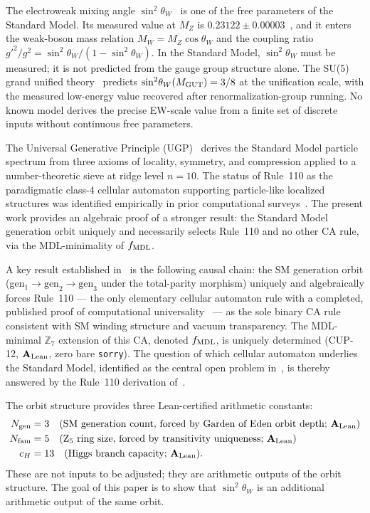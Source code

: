 \documentclass[11pt]{article}
\theoremstyle{remark}
\newcommand{\Ngen}{N_{\rm gen}}
\newcommand{\Nfam}{N_{\rm fam}}
\newcommand{\cH}{c_H}
\newcommand{\sinwsq}{\sin^2\!\theta_W}
\newcommand{\CatAL}{\ensuremath{\textbf{A}_{\rm Lean}}}
\begin{document}
The electroweak mixing angle $\sinwsq$~\cite{Weinberg1967,Glashow1961,Salam1968} is one of the free parameters of the Standard Model.
Its measured value at $M_Z$ is $0.23122 \pm 0.00003$~\cite{ParticleDataGroup2022}, and it
enters the weak-boson mass relation $M_W = M_Z \cos\theta_W$ and the coupling ratio
$g'^2/g^2 = \sinwsq/(1 - \sinwsq)$.
In the Standard Model, $\sinwsq$ must be measured; it is not predicted from the gauge
group structure alone.
The SU(5) grand unified theory~\cite{GeorgiGlashow1974} predicts
$\sinwsq(M_{\rm GUT}) = 3/8$ at the unification scale, with the measured low-energy
value recovered after renormalization-group running.
No known model derives the precise EW-scale value from a finite set of discrete inputs
without continuous free parameters.

\medskip

The Universal Generative Principle (UGP)~\cite{Spivack2026_SM_UGP} derives the Standard
Model particle spectrum from three axioms of locality, symmetry, and compression applied
to a number-theoretic sieve at ridge level $n = 10$.
The status of Rule~110 as the paradigmatic class-4 cellular automaton supporting
particle-like localized structures was identified empirically in prior computational
surveys~\cite{Wolfram2020Tech}.
The present work provides an algebraic proof of a stronger result: the Standard Model
generation orbit uniquely and necessarily selects Rule~110 and no other CA rule, via the
MDL-minimality of $f_{\rm MDL}$.

A key result established in~\cite{SpivackCompUniversality} is the following causal chain:
the SM generation orbit (gen$_1 \to \mathrm{gen}_2 \to \mathrm{gen}_3$ under the
total-parity morphism) uniquely and algebraically forces Rule~110 --- the only elementary
cellular automaton rule with a completed, published proof of computational
universality~\cite{Cook2004,Cook2009} --- as the sole binary CA rule consistent with
SM winding structure and vacuum transparency.
The MDL-minimal $\mathbb{Z}_7$ extension of this CA, denoted $f_{\rm MDL}$, is uniquely
determined (CUP-12, $\CatAL$, zero bare \texttt{sorry}).
The question of which cellular automaton underlies the Standard Model, identified as
the central open problem in~\cite[Sect.~8.1]{tHooft2016CA}, is thereby answered by
the Rule~110 derivation of~\cite{SpivackCompUniversality}.

The orbit structure provides three Lean-certified arithmetic constants:
\begin{align}
  \Ngen &= 3 \quad (\text{SM generation count, forced by Garden of Eden orbit depth; } \CatAL) \nonumber\\
  \Nfam &= 5 \quad (\text{Z}_5 \text{ ring size, forced by transitivity uniqueness; } \CatAL) \nonumber\\
  \cH   &= 13 \quad (\text{Higgs branch capacity; } \CatAL).\nonumber
\end{align}
These are not inputs to be adjusted; they are arithmetic outputs of the orbit structure.
The goal of this paper is to show that $\sinwsq$ is an additional arithmetic output of
the same orbit.
\end{document}
